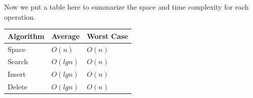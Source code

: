 \documentclass[../main.tex]{subfiles}
\begin{document}





     
 
   

Now  we put a table here to summarize the space and time complexity for each operation.
\begin{table}[h]
\begin{small}
\centering
\noindent{}
 \noindent \begin{tabular}{|p{}|p{}| p{}|}
  \hline
 Algorithm & Average & Worst Case  \\ \hline
Space  & $O(n)$& $O(n)$ \\
Search   & $O(lgn)$ & $O(n)$ \\ \hline

Insert & $O(lgn)$ & $O(n)$ \\ 
Delete & $O(lgn)$ & $O(n)$ \\ \hline
\end{tabular}
  \label{tab:msrc_precession}
  \end{small}
\end{table}
\end{document}
